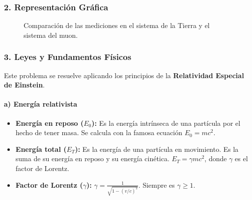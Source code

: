 \subsubsection*{2. Representación Gráfica}
\begin{figure}[H]
    \centering
    \caption{Comparación de las mediciones en el sistema de la Tierra y el sistema del muon.}
\end{figure}

\subsubsection*{3. Leyes y Fundamentos Físicos}
Este problema se resuelve aplicando los principios de la \textbf{Relatividad Especial de Einstein}.
\paragraph*{a) Energía relativista}
\begin{itemize}
    \item \textbf{Energía en reposo ($E_0$):} Es la energía intrínseca de una partícula por el hecho de tener masa. Se calcula con la famosa ecuación $E_0 = mc^2$.
    \item \textbf{Energía total ($E_T$):} Es la energía de una partícula en movimiento. Es la suma de su energía en reposo y su energía cinética. $E_T = \gamma mc^2$, donde $\gamma$ es el factor de Lorentz.
    \item \textbf{Factor de Lorentz ($\gamma$):} $\gamma = \frac{1}{\sqrt{1 - (v/c)^2}}$. Siempre es $\gamma \ge 1$.
\end{itemize}

